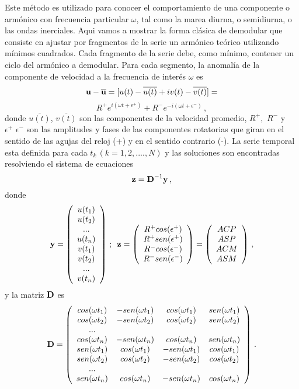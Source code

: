 \documentclass[
]{agujournal2019}
\begin{document}
Este método es utilizado para conocer el comportamiento de una
componente o armónico con frecuencia particular \(\omega\), tal como la
marea diurna, o semidiurna, o las ondas inerciales. Aqui vamos a mostrar
la forma clásica de demodular que consiste en ajustar por fragmentos de
la serie un armónico teórico utilizando mínimos cuadrados. Cada
fragmento de la serie debe, como mínimo, contener un ciclo del armónico
a demodular. Para cada segmento, la anomalía de la componente de
velocidad a la frecuencia de interés \(\omega\) es
\[{\textbf u} - \overline{\textbf u}=[u(t)-\overline{u(t)} +iv(t)-\overline{v(t)}]=\]
\[R^+ e^{i(\omega t + \epsilon^+)} + R^- e^{-i(\omega t + \epsilon^-)}\,,\]
donde \(\overline{u(t)}\), \(\overline{v(t)}\) son las componentes de la
velocidad promedio, \(R^+,\,\,R^-\) y \(\epsilon^+\,\,\epsilon^-\) son
las amplitudes y fases de las componentes rotatorias que giran en el
sentido de las agujas del reloj (+) y en el sentido contrario (-). La
serie temporal esta definida para cada \(t_k\,(k=1,2,....,N)\) y las
soluciones son encontradas resolviendo el sistema de ecuaciones
\[{\textbf z}={\textbf D}^{-1}{\textbf y}\,,\] donde
\[{\textbf y}=\left( \begin{array}{c}
u(t_1) \\
u(t_2) \\
... \\
u(t_n) \\
v(t_1) \\
v(t_2) \\
... \\
v(t_n) \\
\end{array} \right)\,;\,\,\,
{\textbf z}=\left( \begin{array}{c}
R^+cos(\epsilon^+) \\
R^+sen(\epsilon^+)\\
R^-cos(\epsilon^-) \\
R^-sen(\epsilon^-)\\
\end{array} \right)=
\left( \begin{array}{c}
ACP \\
ASP\\
ACM \\
ASM\\
\end{array} \right)\,,\] y la matriz \({\textbf D}\) es
\[{\textbf D}=\left( \begin{array}{cccc}
cos(\omega t_1) & -sen(\omega t_1) & cos(\omega t_1) & sen(\omega t_1) \\
cos(\omega t_2) & -sen(\omega t_2) & cos(\omega t_2) & sen(\omega t_2) \\
... \\
cos(\omega t_n) & -sen(\omega t_n) & cos(\omega t_n) & sen(\omega t_n) \\
sen(\omega t_1) & cos(\omega t_1) & -sen(\omega t_1) & cos(\omega t_1) \\
sen(\omega t_2) & cos(\omega t_2) & -sen(\omega t_2) & cos(\omega t_2) \\
... \\
sen(\omega t_n) & cos(\omega t_n) & -sen(\omega t_n) & cos(\omega t_n) \\
\end{array} \right)\,.\]
\end{document}
